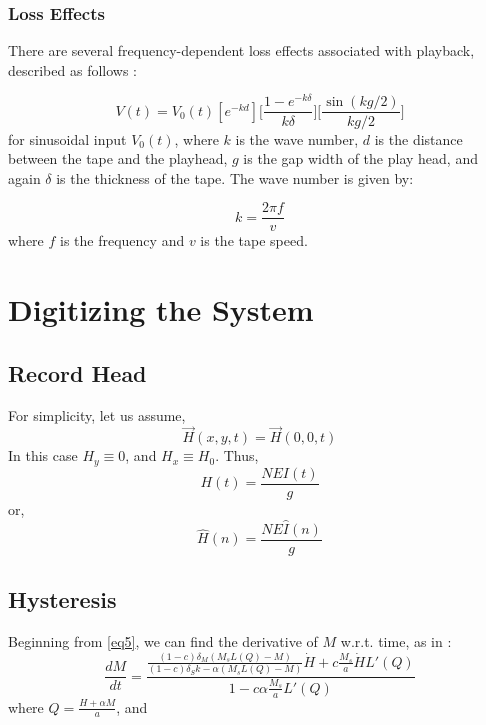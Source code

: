 \documentclass[twoside,a4paper]{article}
\begin{document}
\subsubsection{Loss Effects}
There are several frequency-dependent loss effects associated with playback,
described as follows \cite{Kadis}:

\begin{equation}
    V(t) = V_0(t) [e^{-kd}] \Big[\frac{1 - e^{-k \delta}}{k \delta} \Big] \Big[\frac{\sin (kg /2)}{kg/2} \Big]
    \label{eq:lossEffects}
\end{equation}
%
for sinusoidal input $V_0(t)$, where $k$ is the wave number, $d$ is the distance between the tape and the playhead,
$g$ is the gap width of the play head, and again $\delta$ is the thickness of the tape. The wave number
is given by:

\begin{equation}
    k = \frac {2 \pi f}{v}
    \label{eq:wavenumber}
\end{equation}
%
where $f$ is the frequency and $v$ is the tape speed.

\section{Digitizing the System}
\subsection{Record Head}
For simplicity, let us assume,
\begin{equation}
    \vec{H}(x,y,t) = \vec{H}(0,0,t)
    \label{eq:spatialApprox}
\end{equation}
%
In this case $H_y \equiv 0$, and $H_x \equiv H_0$. Thus,
\begin{equation}
    H(t) = \frac{NEI(t)}{g}
    \label{eq15}
\end{equation}
%
or,
\begin{equation}
    \hat{H}(n) = \frac{NE\hat{I}(n)}{g}
    \label{eq:Hin}
\end{equation}

\subsection{Hysteresis}
Beginning from \cref{eq5}, we can find the derivative of $M$ w.r.t. time,
as in \cite{Hysteresis}:
\begin{equation}
    \frac{dM}{dt} = \frac{\frac{(1-c) \delta_M (M_sL(Q) - M)}{(1-c) \delta_S k - \alpha (M_sL(Q) - M)} \dot{H} + c \frac{M_s}{a} \dot{H} L'(Q)}{1 - c \alpha \frac{M_s}{a} L'(Q)}
    \label{eq:dmdt}
\end{equation}
%
where $Q = \frac{H + \alpha M}{a}$, and
\end{document}
